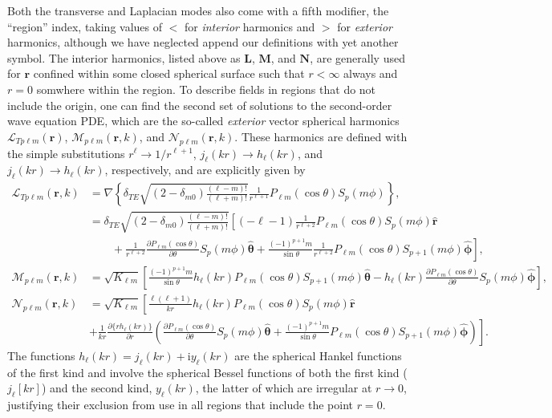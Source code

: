 \documentclass{article}
\begin{document}
Both the transverse and Laplacian modes also come with a fifth modifier, the ``region'' index, taking values of $<$ for \textit{interior} harmonics and $>$ for \textit{exterior} harmonics, although we have neglected append our definitions with yet another symbol. The interior harmonics, listed above as $\mathbf{L}$, $\mathbf{M}$, and $\mathbf{N}$, are generally used for $\mathbf{r}$ confined within some closed spherical surface such that $r<\infty$ always and $r = 0$ somwhere within the region. To describe fields in regions that do not include the origin, one can find the second set of solutions to the second-order wave equation PDE, which are the so-called \textit{exterior} vector spherical harmonics $\bm{\mathcal{L}}_{Tp\ell m}(\mathbf{r})$, $\bm{\mathcal{M}}_{p\ell m}(\mathbf{r},k)$, and $\bm{\mathcal{N}}_{p\ell m}(\mathbf{r},k)$. These harmonics are defined with the simple substitutions $r^{\ell}\to1/r^{\ell + 1}$, $j_\ell(kr)\to h_\ell(kr)$, and $j_\ell(kr)\to h_\ell(kr)$, respectively, and are explicitly given by
\begin{equation}
\begin{split}
\bm{\mathcal{L}}_{Tp\ell m}(\mathbf{r},k) &= \nabla\left\{\delta_{TE}\sqrt{(2 - \delta_{m0})\frac{(\ell - m)!}{(\ell + m)!}}\frac{1}{r^{\ell + 1}} P_{\ell m}(\cos\theta)S_p(m\phi)\right\},\\
&= \delta_{TE}\sqrt{(2 - \delta_{m0})\frac{(\ell - m)!}{(\ell + m)!}}\left[(-\ell - 1)\frac{1}{r^{\ell + 2}}P_{\ell m}(\cos\theta)S_p(m\phi)\hat{\mathbf{r}}\right.\\
&\qquad+ \left.\frac{1}{r^{\ell + 2}}\frac{\partial P_{\ell m}(\cos\theta)}{\partial \theta}S_p(m\phi)\hat{\bm{\theta}} + \frac{(-1)^{p+1}m}{\sin\theta}\frac{1}{r^{\ell + 2}}P_{\ell m}(\cos\theta)S_{p+1}(m\phi)\hat{\bm{\phi}} \right],\\[1.0em]
\bm{\mathcal{M}}_{p\ell m}(\mathbf{r},k) &= \sqrt{K_{\ell m}}\left[\frac{(-1)^{p + 1}m}{\sin\theta}h_\ell(kr)P_{\ell m}(\cos\theta)S_{p+1}(m\phi)\hat{\bm{\theta}} - h_\ell(kr)\frac{\partial P_{\ell m}(\cos\theta)}{\partial\theta}S_p(m\phi)\hat{\bm{\phi}}\right],\\[0.5em]
\bm{\mathcal{N}}_{p\ell m}(\mathbf{r},k) &= \sqrt{K_{\ell m}}\left[\frac{\ell(\ell + 1)}{kr}h_\ell(kr)P_{\ell m}(\cos\theta)S_p(m\phi)\hat{\mathbf{r}}\right.\\
&+ \left.\frac{1}{kr}\frac{\partial\{rh_\ell(kr)\}}{\partial r}\left(\frac{\partial P_{\ell m}(\cos\theta)}{\partial\theta}S_p(m\phi)\hat{\bm{\theta}} + \frac{(-1)^{p+1}m}{\sin\theta}P_{\ell m}(\cos\theta)S_{p + 1}(m\phi)\hat{\bm{\phi}}\right)\right].
\end{split}
\end{equation}
The functions $h_\ell(kr) = j_\ell(kr) + \mathrm{i}y_\ell(kr)$ are the spherical Hankel functions of the first kind and involve the spherical Bessel functions of both the first kind ($j_\ell[kr]$) and the second kind, $y_\ell(kr)$, the latter of which are irregular at $r\to0$, justifying their exclusion from use in all regions that include the point $r = 0$. 
\end{document}
